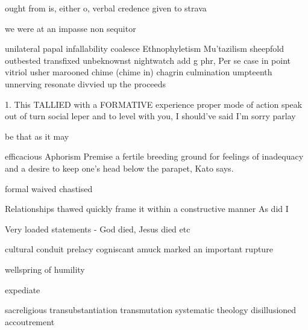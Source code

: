 ought from is, either o, verbal credence given to
strava

we were at an impasse
non sequitor

unilateral papal infallability
coalesce
Ethnophyletism
Mu'tazilism
sheepfold
outbested
transfixed
unbeknownst
nightwatch
add g phr,
Per se
case in point
vitriol
usher
marooned
chime (chime in)
chagrin
culmination
umpteenth
unnerving
resonate
divvied up the proceeds

1. This TALLIED with a FORMATIVE experience
proper mode of action
speak out of turn
social leper
and to level with you, I should've said I'm sorry
parlay

be that as it may

efficacious
Aphorism
Premise
 a fertile breeding ground for feelings of inadequacy and a desire to keep one’s head below the parapet, Kato says.

formal
waived
chastised

Relationships thawed
quickly frame it within a constructive manner
As did I

Very loaded statements - God died, Jesus died etc


cultural conduit
prelacy
cogniscant
amuck
marked an important rupture

wellspring of humility

expediate

sacreligious
transubstantiation
transmutation
systematic theology
disillusioned
accoutrement

